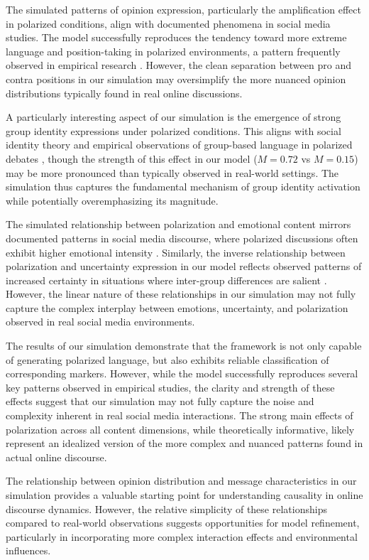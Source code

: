 The simulated patterns of opinion expression, particularly the amplification effect in polarized conditions, align with documented phenomena in social media studies. The model successfully reproduces the tendency toward more extreme language and position-taking in polarized environments, a pattern frequently observed in empirical research \citep{wahlstrom_dynamics_2021, simchon_troll_2022}. However, the clean separation between pro and contra positions in our simulation may oversimplify the more nuanced opinion distributions typically found in real online discussions.

A particularly interesting aspect of our simulation is the emergence of strong group identity expressions under polarized conditions. This aligns with social identity theory \citep{tajfel_integrative_1979, huddy_social_2001} and empirical observations of group-based language in polarized debates \citep{albertson_dog-whistle_2015,ruiz-sanchez_us_2019,bliuc_online_2021,iyengar_fear_2015}, though the strength of this effect in our model ($M = 0.72$ vs $M = 0.15$) may be more pronounced than typically observed in real-world settings. The simulation thus captures the fundamental mechanism of group identity activation while potentially overemphasizing its magnitude.

The simulated relationship between polarization and emotional content mirrors documented patterns in social media discourse, where polarized discussions often exhibit higher emotional intensity \citep{asker_thinking_2019,fischer_emotion_2023}. Similarly, the inverse relationship between polarization and uncertainty expression in our model reflects observed patterns of increased certainty in situations where inter-group differences are salient \citep{holtz_intergroup_2001, holtz_relative_2008, winter_toward_2019}. However, the linear nature of these relationships in our simulation may not fully capture the complex interplay between emotions, uncertainty, and polarization observed in real social media environments.

The results of our simulation demonstrate that the framework is not only capable of generating polarized language, but also exhibits reliable classification of corresponding markers. However, while the model successfully reproduces several key patterns observed in empirical studies, the clarity and strength of these effects suggest that our simulation may not fully capture the noise and complexity inherent in real social media interactions. The strong main effects of polarization across all content dimensions, while theoretically informative, likely represent an idealized version of the more complex and nuanced patterns found in actual online discourse.

The relationship between opinion distribution and message characteristics in our simulation provides a valuable starting point for understanding causality in online discourse dynamics. However, the relative simplicity of these relationships compared to real-world observations suggests opportunities for model refinement, particularly in incorporating more complex interaction effects and environmental influences.

